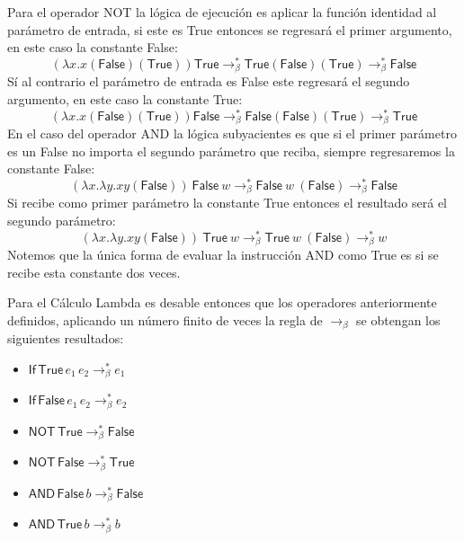     Para el operador \textsf{NOT} la lógica de ejecución es aplicar la función identidad al parámetro de entrada, si este es \textsf{True} entonces se regresará el primer argumento, en este caso la constante \textsf{False}: \[ (\lambda x.x (\textsf{False})(\textsf{True}))\textsf{True} \to_\beta^* \textsf{True}(\textsf{False})(\textsf{True}) \to_\beta^* \textsf{False}\] 
	Sí al contrario el parámetro de entrada es \textsf{False} este regresará el segundo argumento, en este caso la constante \textsf{True}: \[ (\lambda x.x (\textsf{False})(\textsf{True}))\textsf{False} \to_\beta^* \textsf{False}(\textsf{False})(\textsf{True}) \to_\beta^* \textsf{True}\]
    En el caso del operador \textsf{AND} la lógica subyacientes es que si el primer parámetro es un \textsf{False} no importa el segundo parámetro que reciba, siempre regresaremos la constante \textsf{False}:
\[ (\lambda x.\lambda y. xy (\textsf{False}))\ \textsf{False}\  w \to_\beta^* \textsf{False}\ w\ (\textsf{False}) \to_\beta^* \textsf{False}  \]
Si recibe como primer parámetro la constante \textsf{True} entonces el resultado será el segundo parámetro:
\[ (\lambda x.\lambda y. xy (\textsf{False}))\ \textsf{True}\  w \to_\beta^* \textsf{True}\ w\ (\textsf{False}) \to_\beta^* w  \]
Notemos que la única forma de evaluar la instrucción \textsf{AND} como \textsf{True} es si se recibe esta constante dos veces.

Para el Cálculo Lambda es desable entonces que los operadores anteriormente definidos, aplicando un número finito de veces la regla de $\to_\beta$ se obtengan los siguientes resultados:
   \begin{center}

        \begin{itemize} \centering
            \item $\mathsf{If}\,\textsf{True}\,e_1\,e_2 \to_\beta^* e_1$ 
            \item $\mathsf{If}\,\textsf{False}\,e_1\,e_2 \to_\beta^* e_2$ 
            \item $\mathsf{NOT}\,\textsf{True}\to_\beta^* \textsf{False}$
            \item $\mathsf{NOT}\,\textsf{False}\to_\beta^* \textsf{True}$
            \item $\mathsf{AND}\,\textsf{False}\,b\to_\beta^* \textsf{False}$
            \item $\mathsf{AND}\,\textsf{True}\,b\to_\beta^* b$
        \end{itemize}
   \end{center} 

